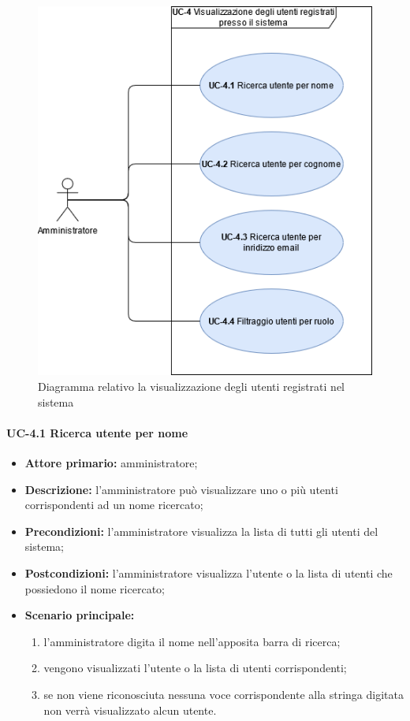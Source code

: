 \begin{figure}[H]
    \centering
      \includegraphics[scale=0.50]{src/CasiDUso/immagini/VisualizzazioneUtenti.png}
    \caption{Diagramma relativo la visualizzazione degli utenti registrati nel sistema}
\end{figure}

    \paragraph{UC-4.1 Ricerca utente per nome}
    \begin{itemize}
        \item \textbf{Attore primario:} amministratore; 
    
        \item \textbf{Descrizione:} l'amministratore può visualizzare uno o più utenti corrispondenti ad un nome ricercato;
    
        \item \textbf{Precondizioni:} l'amministratore visualizza la lista di tutti gli utenti del sistema;
    
        \item \textbf{Postcondizioni:} l'amministratore visualizza l'utente o la lista di utenti che possiedono il nome ricercato;
    
        \item \textbf{Scenario principale:}
              \begin{enumerate}
                  \item l'amministratore digita il nome nell'apposita barra di ricerca;
                  \item vengono visualizzati l'utente o la lista di utenti corrispondenti;
                  \item se non viene riconosciuta nessuna voce corrispondente alla stringa digitata non verrà visualizzato alcun utente.
              \end{enumerate}
    \end{itemize}

